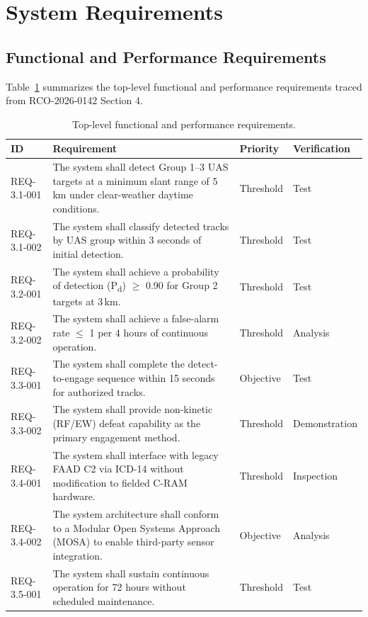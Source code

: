 \section{System Requirements}

\subsection{Functional and Performance Requirements}
Table~\ref{tab:reqs} summarizes the top-level functional and performance requirements traced from RCO-2026-0142 Section 4.

\begin{table}[htbp]
\centering
\footnotesize
\begin{tabularx}{\linewidth}{@{}l >{\raggedright\arraybackslash}X l l@{}}
\toprule
\rowcolor{accentlight}
\textbf{ID} & \textbf{Requirement} & \textbf{Priority} & \textbf{Verification} \\
\midrule
REQ-3.1-001 & The system shall detect Group 1--3 UAS targets at a minimum slant range of 5\,km under clear-weather daytime conditions. & Threshold & Test \\
REQ-3.1-002 & The system shall classify detected tracks by UAS group within 3 seconds of initial detection. & Threshold & Test \\
REQ-3.2-001 & The system shall achieve a probability of detection (P\textsubscript{d}) $\geq$ 0.90 for Group 2 targets at 3\,km. & Threshold & Test \\
REQ-3.2-002 & The system shall achieve a false-alarm rate $\leq$ 1 per 4 hours of continuous operation. & Threshold & Analysis \\
REQ-3.3-001 & The system shall complete the detect-to-engage sequence within 15 seconds for authorized tracks. & Objective & Test \\
REQ-3.3-002 & The system shall provide non-kinetic (RF/EW) defeat capability as the primary engagement method. & Threshold & Demonstration \\
REQ-3.4-001 & The system shall interface with legacy FAAD C2 via ICD-14 without modification to fielded C-RAM hardware. & Threshold & Inspection \\
REQ-3.4-002 & The system architecture shall conform to a Modular Open Systems Approach (MOSA) to enable third-party sensor integration. & Objective & Analysis \\
REQ-3.5-001 & The system shall sustain continuous operation for 72 hours without scheduled maintenance. & Threshold & Test \\
\bottomrule
\end{tabularx}
\caption{Top-level functional and performance requirements.}
\label{tab:reqs}
\end{table}

\clearpage


